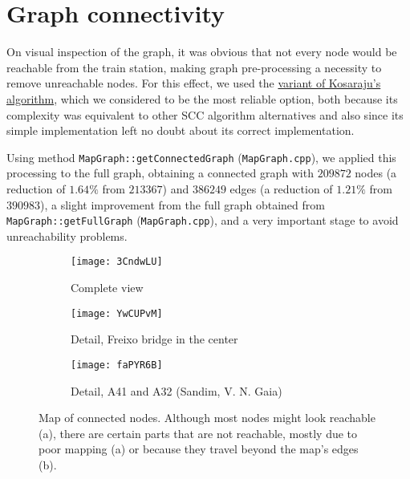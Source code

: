 \chapter{Graph connectivity} \label{connectivity-graphs}
On visual inspection of the graph, it was obvious that not every node would be reachable from the train station, making graph pre-processing a necessity to remove unreachable nodes.
For this effect, we used the \hyperref[algorithm-scc-kosaraju-v]{variant of Kosaraju's algorithm}, which we considered to be the most reliable option, both because its complexity was equivalent to other \acrshort{SCC} algorithm alternatives and also since its simple implementation left no doubt about its correct implementation.\par
Using method \texttt{MapGraph::getConnectedGraph} (\texttt{MapGraph.cpp}), we applied this processing to the full graph, obtaining a connected graph with $209872$ nodes (a reduction of $1.64\%$ from $213367$) and $386249$ edges (a reduction of $1.21\%$ from $390983$), a slight improvement from the full graph obtained from \texttt{MapGraph::getFullGraph} (\texttt{MapGraph.cpp}), and a very important stage to avoid unreachability problems.
\begin{figure}[h]
    \centering
    \begin{subfigure}{.50\textwidth}
        \centering
        \texttt{[image: 3CndwLU]}
        \caption{Complete view}
    \end{subfigure}
    \begin{subfigure}{.49\textwidth}
        \centering
        \texttt{[image: YwCUPvM]}
        \caption{Detail, Freixo bridge in the center}
        \vspace{0.6em}
        \texttt{[image: faPYR6B]}
        \caption{Detail, A41 and A32 (Sandim, V. N. Gaia)}
    \end{subfigure}
    \caption[Map of connected nodes]{Map of connected nodes. Although most nodes might look reachable (a), there are certain parts that are not reachable, mostly due to poor mapping (a) or because they travel beyond the map's edges (b).}
\end{figure}
